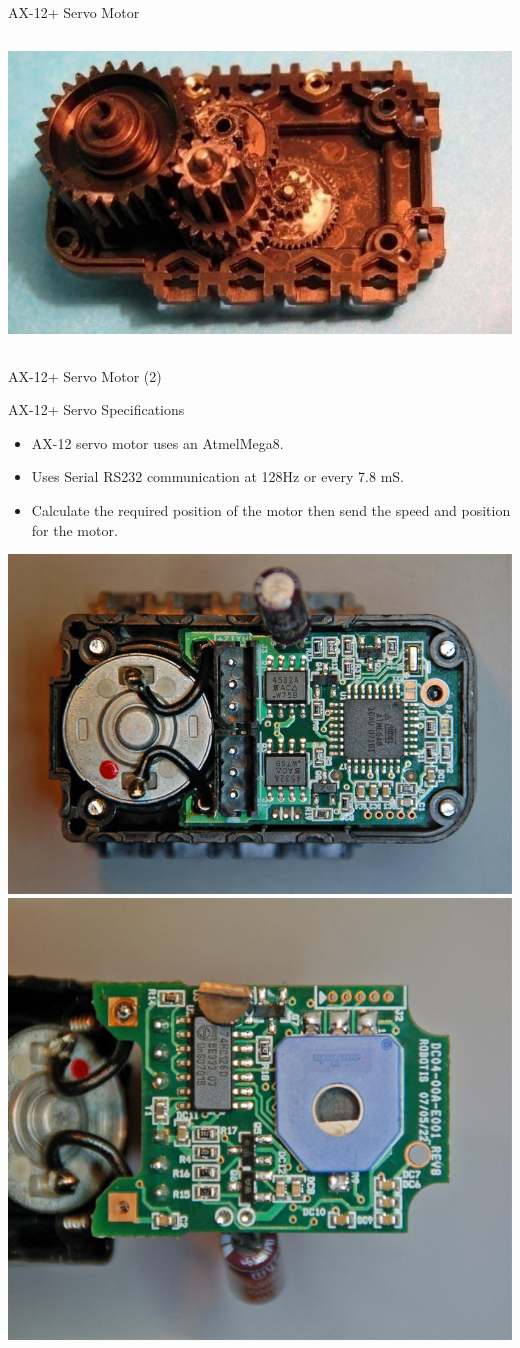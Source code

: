 \documentclass[compress]{beamer}
\begin{document}
\begin{frame}{AX-12+ Servo Motor}
\begin{columns}
\begin{column}{0.5\linewidth}
\begin{center}
                \includegraphics[width=0.8\linewidth]{image27}
            \end{center}
        \end{column}
    \end{columns}

\end{frame}

\begin{frame}{AX-12+ Servo Motor (2)}

    AX-12+ Servo Specifications

    \begin{itemize}

        \item AX-12 servo motor uses an AtmelMega8.
        \item Uses Serial RS232 communication at 128Hz or every 7.8 mS.
        \item Calculate the required position of the motor then send the speed and
            position for the motor.
    \end{itemize}

    \begin{center}
        \includegraphics[width=0.4\linewidth]{image29}
        \includegraphics[width=0.4\linewidth]{image30}
    \end{center}
\end{frame}
\end{document}

